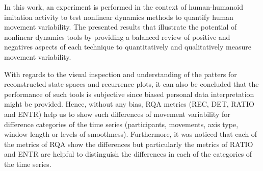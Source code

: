 %
%

In this work, an experiment is performed in the context of human-humanoid imitation activity
to test nonlinear dynamics methods to quantify human movement variability. 
The presented results that illustrate the potential of nonlinear dynamics tools 
by providing a balanced review of positive and negatives aspects of each 
technique to quantitatively and qualitatively measure movement variability.

With regards to the visual inspection and understanding of the patters
for reconstructed state spaces and recurrence plots,
it can also be concluded that the performance of such tools is subjective 
since biased personal data interpretation might be provided.
Hence, without any bias, RQA metrics (REC, DET, RATIO and ENTR) help us to show 
such differences of movement variability for difference categories 
of the time series (participants, movements, axis type, window length or levels of smoothness).
Furthermore, it was noticed that each of the metrics of RQA show the differences 
but particularly the metrics of RATIO and ENTR are helpful to distinguish 
the differences in each of the categories of the time series.

